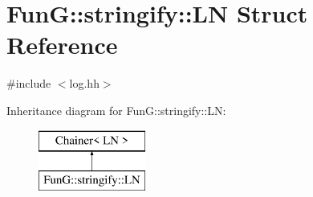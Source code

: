 \hypertarget{structFunG_1_1stringify_1_1LN}{\section{Fun\-G\-:\-:stringify\-:\-:L\-N Struct Reference}
\label{structFunG_1_1stringify_1_1LN}
}


{\ttfamily \#include $<$log.\-hh$>$}

Inheritance diagram for Fun\-G\-:\-:stringify\-:\-:L\-N\-:\begin{figure}[H]
\begin{center}
\leavevmode
\includegraphics[height=2.000000cm]{structFunG_1_1stringify_1_1LN}
\end{center}
\end{figure}
